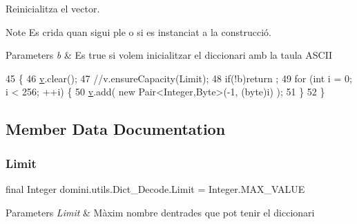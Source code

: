 Reinicialitza el vector. 

\begin{DoxyNote}{Note}
Es crida quan sigui ple o si es instanciat a la construcció. 
\end{DoxyNote}

\begin{DoxyParams}{Parameters}
{\em b} & Es true si volem inicialitzar el diccionari amb la taula A\+S\+C\+II \\
\hline
\end{DoxyParams}

\begin{DoxyCode}
45                                             \{
46         \hyperlink{classdomini_1_1utils_1_1Dict__Decode_a351bb8836b391e5e21ebc9cc1943a22d}{v}.clear();
47         \textcolor{comment}{//v.ensureCapacity(Limit);}
48         \textcolor{keywordflow}{if}(!b)return ;
49         \textcolor{keywordflow}{for} (\textcolor{keywordtype}{int} i = 0; i < 256; ++i) \{
50             \hyperlink{classdomini_1_1utils_1_1Dict__Decode_a351bb8836b391e5e21ebc9cc1943a22d}{v}.add( \textcolor{keyword}{new} Pair<Integer,Byte>(-1, (byte)i) );
51         \}
52     \}
\end{DoxyCode}


\subsection{Member Data Documentation}
\mbox{\label{classdomini_1_1utils_1_1Dict__Decode_a10fd6693de70b9091942496b35324c5a}} 
\subsubsection{\texorpdfstring{Limit}{Limit}}
{\footnotesize\ttfamily final Integer domini.\+utils.\+Dict\+\_\+\+Decode.\+Limit = Integer.\+M\+A\+X\+\_\+\+V\+A\+L\+UE\hspace{0.3cm}{\ttfamily [package]}}


\begin{DoxyParams}{Parameters}
{\em Limit} & Màxim nombre d\textquotesingle{}entrades que pot tenir el diccionari \\
\hline
\end{DoxyParams}
\mbox{\label{classdomini_1_1utils_1_1Dict__Decode_a351bb8836b391e5e21ebc9cc1943a22d}} 
